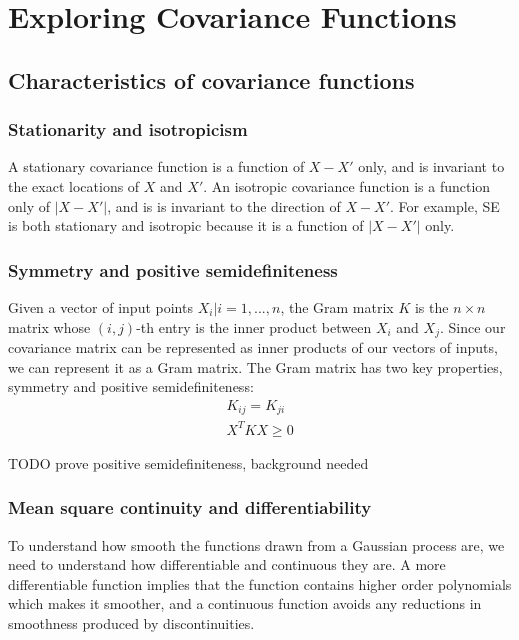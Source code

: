 \section{Exploring Covariance Functions \cite{gp-ml}}


\subsection{Characteristics of covariance functions \cite{gp-ml}}

\subsubsection{Stationarity and isotropicism}
A stationary covariance function is a function of $X - X'$ only, and is invariant to the exact locations of $X$ and $X'$. An isotropic covariance function is a function only of $|X - X'|$, and is is invariant to the direction of $X - X'$. For example, SE \cite{eq:se} is both stationary and isotropic because it is a function of $|X - X'|$ only.

\subsubsection{Symmetry and positive semidefiniteness}
Given a vector of input points ${X_i | i = 1, ..., n}$, the Gram matrix $K$ is the $n \times n$ matrix whose $(i,j)$-th entry is the inner product between $X_i$ and $X_j$. Since our covariance matrix can be represented as inner products of our vectors of inputs, we can represent it as a Gram matrix. The Gram matrix has two key properties, symmetry and positive semidefiniteness:
\begin{equation*}
    \begin{aligned}
        K_{ij} = K_{ji} \\
        X^T K X \geq 0
    \end{aligned}
\end{equation*}

TODO prove positive semidefiniteness, background needed

\subsubsection{Mean square continuity and differentiability}

To understand how smooth the functions drawn from a Gaussian process are, we need to understand how differentiable and continuous they are. A more differentiable function implies that the function contains higher order polynomials which makes it smoother, and a continuous function avoids any reductions in smoothness produced by discontinuities.

